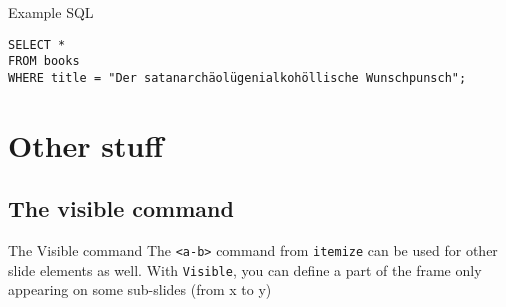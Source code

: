 \begin{frame}[fragile]{Example SQL}
\begin{verbatim}
SELECT *
FROM books
WHERE title = "Der satanarchäolügenialkohöllische Wunschpunsch";
\end{verbatim}
\end{frame}

\section{Other stuff}

\subsection*{The visible command}
\begin{frame}{The Visible command}
The \texttt{<a-b>} command from \texttt{itemize} can be used for other slide elements as well. With \texttt{Visible}, you can define a part of the frame only appearing on some sub-slides (from x to y)

\newLine
{}
  

\end{frame}


